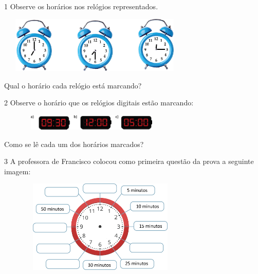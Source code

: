 
\num{1} Observe os horários nos relógios representados.


\includegraphics[width=3.66698in,height=1.05843in]{media/image51.png}

Qual o horário cada relógio está marcando?


\num{2} Observe o horário que os relógios digitais estão marcando:


\includegraphics[width=3.54197in,height=0.29169in]{media/image52.png}

Como se lê cada um dos horários marcados?


\num{3} A professora de Francisco colocou como primeira questão da prova a seguinte imagem:


\includegraphics[width=3.90034in,height=1.75015in]{media/image53.png}

